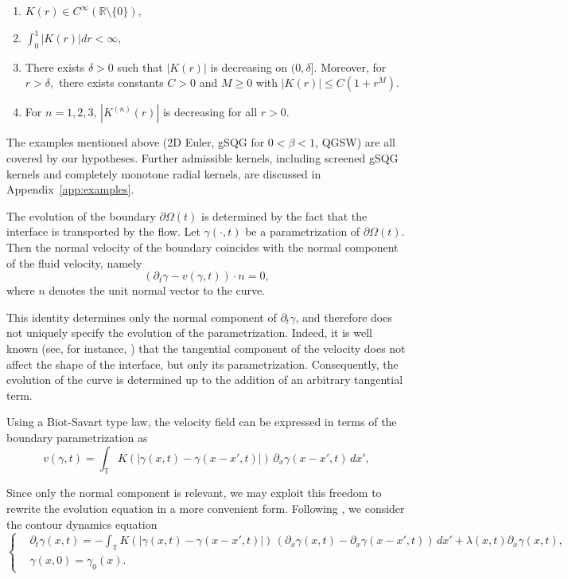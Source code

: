 \documentclass[a4paper]{amsart}
\theoremstyle{definition}
\newcommand{\R}{\ensuremath{\mathbb{R}}}
\begin{document}
\begin{enumerate}[label={(A\arabic*)}]
    \item $K(r)\in C^\infty (\R\setminus \{0\}),$ \label{ass:smoothness}
    \item $\int_0^1 |K(r)| dr < \infty,$ \label{ass:integrability}
    \item There exists $ \delta >0$ such that $|K(r)|$ is decreasing on $(0,\delta]$. Moreover, for $r>\delta,$ there exists constants $C>0$ and $M\geq 0$ with $|K(r)|\leq C(1+r^M).$ \label{ass:compKernel}
    \item For $n=1,2,3$, $|K^{(n)}(r)|$ is decreasing for all $r>0$. \label{ass:monotonicity}
\end{enumerate}

The examples mentioned above (2D Euler, gSQG for $0<\beta<1$, QGSW) are all covered by our hypotheses. Further admissible kernels, including screened gSQG kernels and completely monotone radial kernels, are discussed in Appendix~\ref{app:examples}.

The evolution of the boundary \(\partial\Omega(t)\) is determined by the fact that the interface is transported by the flow. Let \(\gamma(\cdot,t)\) be a parametrization of \(\partial\Omega(t)\). Then the normal velocity of the boundary coincides with the normal component of the fluid velocity, namely
\[
(\partial_t \gamma - v(\gamma,t))\cdot n = 0,
\]
where \(n\) denotes the unit normal vector to the curve.

This identity determines only the normal component of \(\partial_t \gamma\), and therefore does not uniquely specify the evolution of the parametrization. Indeed, it is well known (see, for instance, \cite{gancedo2008SQG}) that the tangential component of the velocity does not affect the shape of the interface, but only its parametrization. Consequently, the evolution of the curve is determined up to the addition of an arbitrary tangential term.

Using a Biot-Savart type law, the velocity field can be expressed in terms of the boundary parametrization as
\[
v(\gamma,t) = \int_\mathbb{T} K(|\gamma(x,t)-\gamma(x-x',t)|)\,\partial_x \gamma(x-x',t)\,dx',
\]

Since only the normal component is relevant, we may exploit this freedom to rewrite the evolution equation in a more convenient form. Following \cite{gancedo2008SQG, gancedo2021local}, we consider the contour dynamics equation 
\begin{equation}\label{eq:CDEmod}\tag{CDE}
    \left\{
    \begin{aligned}
        &\partial_t \gamma(x,t) = -\int_\mathbb{T} K(|\gamma(x,t)-\gamma(x-x',t)|)\,(\partial_x \gamma(x,t)-\partial_x \gamma(x-x',t))\,dx'+ \lambda(x,t)\partial_x\gamma(x,t),\\
        &\gamma(x,0) = \gamma_0(x).
    \end{aligned}
    \right.
\end{equation}
\end{document}
